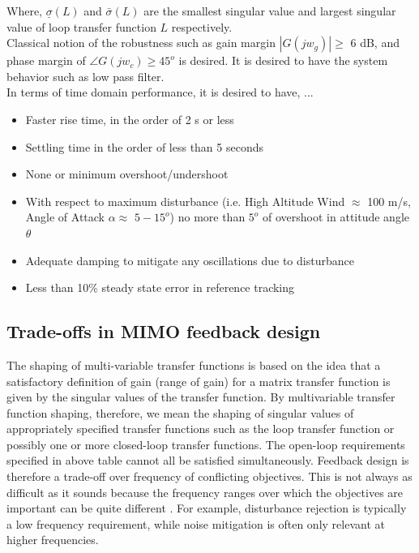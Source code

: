 \documentclass[12pt]{article}
\begin{document}
	\noindent Where, $\underline{\sigma}(L)$ and $\bar{\sigma}(L)$ are the smallest singular value and largest singular value of loop transfer function $L$ respectively.\\
	
	\noindent Classical notion of the robustness such as gain margin $|G(jw_g)| \geq$ 6 dB, and phase margin of $\angle G(jw_c) \geq 45^o$ is desired. It is desired to have the system behavior such as low pass filter.\\
	
	\noindent In terms of time domain performance, it is desired to have, ...
	\begin{itemize}
		\item Faster rise time, in the order of 2 s or less
		\item Settling time in the order of less than 5 seconds
		\item None or minimum overshoot/undershoot
		\item With respect to maximum disturbance (i.e. High Altitude Wind $\approx$ 100 m/s, Angle of Attack $\alpha \approx$ $5-15^{o}$) no more than $5^{o}$ of overshoot in attitude angle $\theta$
		\item Adequate damping to mitigate any oscillations due to disturbance
		\item Less than 10\% steady state error in reference tracking 
	\end{itemize}
	
	\subsection{Trade-offs in MIMO feedback design}
	
	The shaping of multi-variable transfer functions is based on the idea that a satisfactory definition of gain (range of gain) for a matrix transfer function is given by the singular values of the transfer function. By multivariable transfer function shaping, therefore, we mean the shaping of singular values of appropriately specified transfer functions such as the loop transfer function or possibly one or more closed-loop transfer functions. The open-loop requirements specified in above table cannot all be satisfied simultaneously. Feedback design is therefore a trade-off over frequency of conflicting objectives. This is not always as difficult as it sounds because the frequency ranges over which the objectives are important can be quite different \cite{cite3}. For example, disturbance rejection is typically a low frequency requirement, while noise mitigation is often only relevant at higher frequencies. 
	
\end{document}
